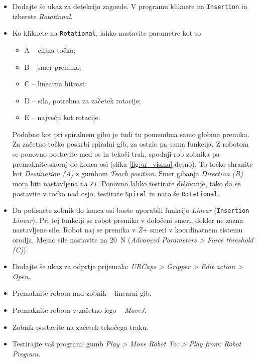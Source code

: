     \begin{mdframed}[backgroundcolor=yellow!20, shadow=true,roundcorner=8pt]
\begin{itemize}
  \item Dodajte še ukaz za detekcijo zagozde. V programu kliknete na \verb"Insertion" in izberete \emph{Rotational}.
  \item Ko kliknete na \verb"Rotational", lahko nastavite parametre kot so
   \begin{itemize}
          \item A -- ciljna točka;
          \item B -- smer premika;
          \item C -- linearna hitrost;
          \item D -- sila, potrebna za začetek rotacije;
          \item E -- največji kot rotacije.
  \end{itemize}
  Podobno kot pri spiralnem gibu je tudi tu pomembna samo globina premika. Za začetno točko poskrbi spiralni gib, za ostalo pa sama funkcija. Z robotom se ponovno postavite med os in tekoči trak, spodnji rob zobnika pa premaknite skoraj do konca osi (slika \ref{fig:ur_visina} desno). To točko shranite kot \emph{Destination (A)} z gumbom \emph{Teach position}. Smer gibanja \emph{Direction (B)} mora biti nastavljena na \verb"Z+". Ponovno lahko testirate delovanje, tako da se postavite v točko nad osjo, testirate \verb"Spiral" in nato še \verb"Rotational".
  \item Da potisnete zobnik do konca osi boste uporabili funkcijo \emph{Linear} (\verb"Insertion" \emph{Linear}). Pri tej funkciji se robot premika v določeni smeri, dokler ne zazna nastavljene sile. Robot naj se premika v \emph{Z$+$} smeri v koordinatnem sistemu orodja. Mejno sile nastavite na 20~N (\emph{Advanced Parameters > Force threshold (C)}).
  \item Dodajte še ukaz za odprtje prijemala: \emph{URCaps > Gripper > Edit action > Open}.
  \item Premaknite robota nad zobnik -- linearni gib.
  \item Premaknite robota v začetno lego -- \emph{MoveJ}.
  \item Zobnik postavite na začetek tekočega traku.
   \item Testirajte vaš program: gumb \emph{Play > Move Robot To: > Play from: Robot Program}.
  \end{itemize}
\end{mdframed}


